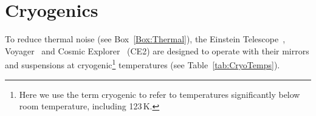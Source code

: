 \chapter{Cryogenics}
\label{sec:Cryogenics}
\vspace{1cm} 


To reduce thermal noise (see Box~\ref{Box:Thermal}), the Einstein Telescope~\cite{ET2011}, Voyager~\cite{Voyager:Inst} and Cosmic Explorer~\cite{CosmicExplorer2017} (CE2) are designed to operate with their mirrors and suspensions at cryogenic\footnote{Here we use the term cryogenic to refer to temperatures significantly below room temperature, including 123\,K.} temperatures (see Table~\ref{tab:CryoTemps}).

